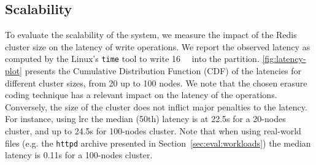 %

\subsection{Scalability}
\label{subsec:latency}
To evaluate the scalability of the system, we measure the impact of the Redis cluster size on the latency of write operations.
We report the observed latency as computed by the Linux's \texttt{time} tool to write \SI{16}{\mebi\byte} into the \SYS partition.
\autoref{fig:latency-plot} presents the Cumulative Distribution Function (CDF) of the latencies for different cluster sizes, from 20 up to 100 nodes.
We note that the chosen erasure coding technique has a relevant impact on the latency of the operations. 
Conversely, the size of the cluster does not inflict major penalties to the latency.
For instance, using \ac{lrc} the median (50th) latency is at 22.5s for a 20-nodes cluster, and up to 24.5s for 100-nodes cluster. 
Note that when using real-world files (e.g. the \texttt{httpd} archive presented in Section~\ref{sec:eval:workloads}) the median latency is 0.11s for a 100-nodes cluster. 

